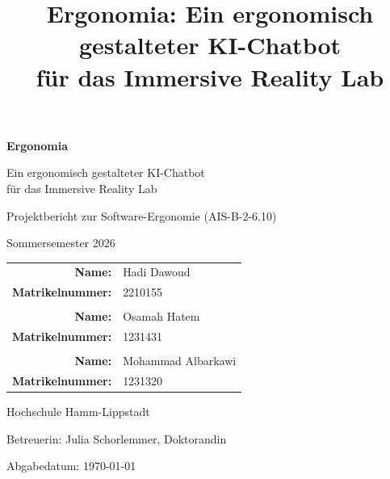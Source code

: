 \documentclass[12pt,a4paper]{article}
\title{Ergonomia: Ein ergonomisch gestalteter KI-Chatbot\\für das Immersive Reality Lab}
\author{}
\date{}
\begin{document}
\begin{titlepage}
    \centering
    \vspace*{4cm}
    {\Huge\bfseries Ergonomia\par}
    \vspace{0.8cm}
    {\Large Ein ergonomisch gestalteter KI-Chatbot\\für das Immersive Reality Lab\par}
    \vspace{1.5cm}
    {\large Projektbericht zur Software-Ergonomie (AIS-B-2-6.10)\par}
    \vspace{0.5cm}
    {\large Sommersemester 2026\par}
    \vspace{2cm}
    \begin{tabular}{rl}
        \textbf{Name:} & Hadi Dawoud \\
        \textbf{Matrikelnummer:} & 2210155 \\
        & \\
        \textbf{Name:} & Osamah Hatem \\
        \textbf{Matrikelnummer:} & 1231431 \\
        & \\
        \textbf{Name:} & Mohammad Albarkawi \\
        \textbf{Matrikelnummer:} & 1231320 \\
    \end{tabular}
    \vspace{1.5cm}\par
    {\large Hochschule Hamm-Lippstadt\par}
    {\large Betreuerin: Julia Schorlemmer, Doktorandin\par}
    \vspace{1cm}
    {\large Abgabedatum: \today\par}
\end{titlepage}


\newpage

\tableofcontents
\newpage







\end{document}

